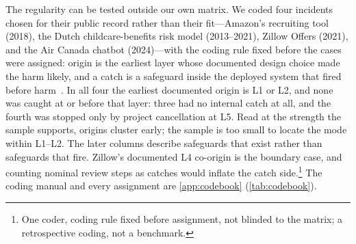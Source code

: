 The regularity can be tested outside our own matrix. We coded four incidents chosen for their
public record rather than their fit---Amazon's recruiting tool (2018), the Dutch childcare-benefits
risk model (2013--2021), Zillow Offers (2021), and the Air Canada chatbot (2024)---with the coding
rule fixed before the cases were assigned: origin is the earliest layer whose documented design
choice made the harm likely, and a catch is a safeguard inside the deployed system that fired
before harm~\cite{reuters2018amazon,amnesty2021xenophobic,zillow2021winddown,aircanada2024bccrt}.
In all four the earliest documented origin is L1 or L2, and none was caught at or before that
layer: three had no internal catch at all, and the fourth was stopped only by project cancellation
at L5. Read at the strength the sample supports, origins cluster early; the sample is too small to
locate the mode within L1--L2. The later columns describe safeguards that exist rather than
safeguards that fire. Zillow's documented L4 co-origin
is the boundary case, and counting nominal review steps as catches would inflate the catch
side.\footnote{One coder, coding rule fixed before assignment, not blinded to the matrix; a
retrospective coding, not a benchmark.} The coding manual and every assignment are
\cref{app:codebook} (\cref{tab:codebook}).
